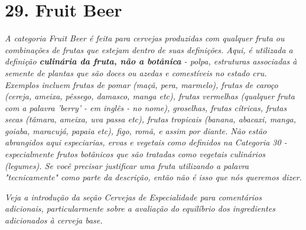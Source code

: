 \section*{29. Fruit Beer}
\textit{A categoria Fruit Beer é feita para cervejas produzidas com qualquer fruta ou combinações de frutas que estejam dentro de suas definições. Aqui, é utilizada a definição \textbf{culinária da fruta, não a botânica} - polpa, estruturas associadas à semente de plantas que são doces ou azedas e comestíveis no estado cru. Exemplos incluem frutas de pomar (maçã, pera, marmelo), frutas de caroço (cereja, ameixa, pêssego, damasco, manga etc), frutas vermelhas (qualquer fruta com a palavra 'berry' - em inglês - no nome), groselhas, frutas cítricas, frutas secas (tâmara, ameixa, uva passa etc), frutas tropicais (banana, abacaxi, manga, goiaba, maracujá, papaia etc), figo, romã, e assim por diante. Não estão abrangidos aqui especiarias, ervas e vegetais como definidos na Categoria 30 - especialmente frutos botânicos que são tratadas como vegetais culinários (legumes). Se você precisar justificar uma fruta utilizando a palavra "tecnicamente" como parte da descrição, então não é isso que nós queremos dizer.}

\textit{Veja a introdução da seção Cervejas de Especialidade para comentários adicionais, particularmente sobre a avaliação do equilíbrio dos ingredientes adicionados à cerveja base.}
